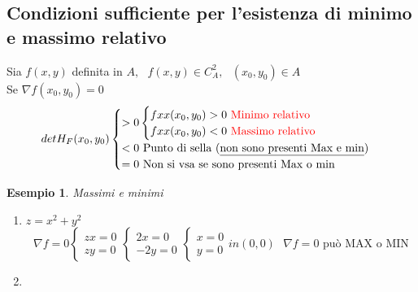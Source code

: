 \documentclass{book}
\newtheorem{esempio}{Esempio}
\begin{document}
\subsection{Condizioni sufficiente per l'esistenza di minimo e massimo relativo}
Sia $f(x,y)$ definita in $A,\text{ } f(x,y)\in C^2_A, \text{ } (x_0,y_0)\in A$\\
Se $\nabla f(x_0,y_0)=0$
\begin{equation*}
  det H_F(x_0,y_0)\begin{cases}
                    >0 \begin{cases}
                         fxx(x_0,y_0)>0 \text{ \color{red} Minimo relativo}\\
                         fxx(x_0,y_0)<0 \text{ \color{red} Massimo relativo}
                       \end{cases}\\
                    <0 \text{ Punto di sella (\underline{non sono presenti Max e min})}\\
                    =0 \text{ Non si vsa se sono presenti Max o min}
                  \end{cases}
\end{equation*}
\begin{esempio}
  Massimi e minimi
  \begin{enumerate}
  \item $z=x^2+y^2$
    \begin{equation*}
      \nabla f=0 \begin{cases}
                   zx=0\\
                   zy=0
                 \end{cases}\begin{cases}
                   2x=0\\
                   -2y=0
                 \end{cases}\begin{cases}
                   x=0\\
                   y=0
                 \end{cases} in (0,0)\text{ }\nabla f=0 \text{ può MAX o MIN}
               \end{equation*}
               \item 
  \end{enumerate}
\end{esempio}     
    
\printindex
\end{document}
